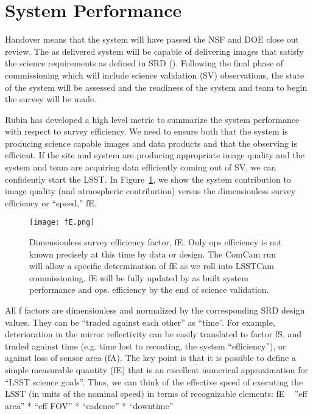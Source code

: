 \section{System Performance}{\label{secSysperf}}
  
Handover means that the system will have passed the NSF and DOE close out review. The as delivered system will be capable of delivering images that satisfy the science requirements as defined in SRD (\cite{LPM-17}). Following the final phase of commissioning which will include science validation (SV) observations, the state of the system will be assessed and the readiness of the system and team to begin the survey will be made. 

Rubin has developed a high level metric to summarize the system performance with respect to survey efficiency. We need to ensure both that the system is producing science capable images and data products and that the observing is efficient. 
If the site and system are producing appropriate image quality and the system and team are acquiring data efficiently coming out of SV, we can confidently start the LSST. In Figure~\ref{fE}, we show the system contribution to image quality (and atmospheric contribution) versus the dimensionless survey efficiency or ``speed,'' fE. 

\begin{figure}%
  \centering
\texttt{[image: fE.png]}
\caption{Dimensionless survey efficiency factor, fE. Only ops efficiency is not known precisely at this time by data or design. The ComCam run will allow a specific determination of fE as we roll into LSSTCam commissioning. fE will be fully updated by as built system performance and ops. efficiency by the end of science validation.}
\label{fE}
\end{figure}

All f factors are dimensionless and normalized by the corresponding SRD design values. They can be “traded against each other” as “time”.
For example, deterioration in the mirror reflectivity can be easily translated to factor fS, and traded against time (e.g. time lost to recoating, the system “efficiency”), or against loss of sensor area (fA).
The key point is that it is possible to define a simple measurable quantity (fE) that is an excellent numerical approximation for “LSST science goals”. Thus, we can think of the effective speed of executing the LSST (in units of the nominal speed) in terms of recognizable elements: fE ~ ”eff area” * “eff FOV” * “cadence” * “downtime”

